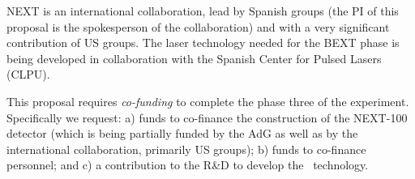NEXT is an international collaboration, lead by Spanish groups (the PI of this proposal is the spokesperson of the collaboration) and with a very significant contribution of US groups. The laser technology needed for the BEXT phase is being developed in collaboration with the Spanish Center for Pulsed Lasers (CLPU). 

 This proposal requires {\em co-funding} to complete the phase three of the experiment. Specifically we request: a) funds to co-finance the construction of the NEXT-100 detector (which is being partially funded by the AdG as well as by the international collaboration, primarily US groups); b) funds to co-finance personnel; and c) a  contribution to the R\&D to develop the \BATA\ technology.   

